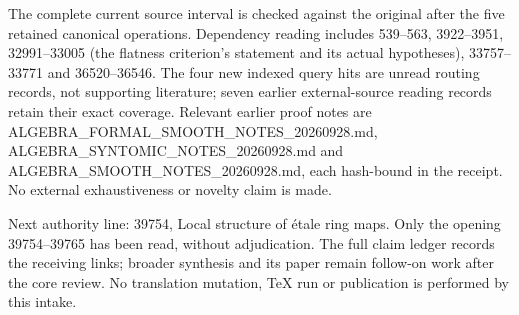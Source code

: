 The complete current source interval is checked against the original after the five retained canonical operations. Dependency reading includes 539--563, 3922--3951, 32991--33005 (the flatness criterion's statement and its actual hypotheses), 33757--33771 and 36520--36546. The four new indexed query hits are unread routing records, not supporting literature; seven earlier external-source reading records retain their exact coverage. Relevant earlier proof notes are ALGEBRA\_FORMAL\_SMOOTH\_NOTES\_20260928.md, ALGEBRA\_SYNTOMIC\_NOTES\_20260928.md and ALGEBRA\_SMOOTH\_NOTES\_20260928.md, each hash-bound in the receipt. No external exhaustiveness or novelty claim is made.

Next authority line: 39754, Local structure of étale ring maps. Only the opening 39754--39765 has been read, without adjudication. The full claim ledger records the receiving links; broader synthesis and its paper remain follow-on work after the core review. No translation mutation, TeX run or publication is performed by this intake.
